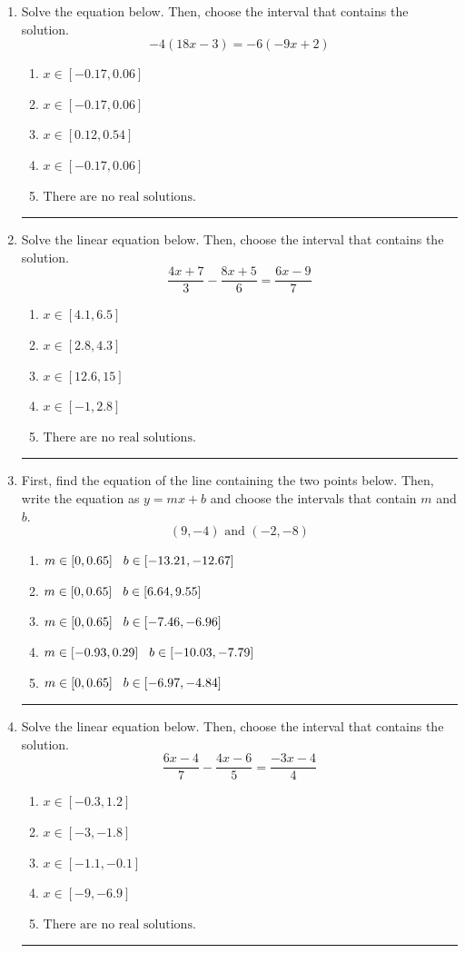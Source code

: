 \documentclass[14pt]{extbook}
\newcommand{\litem}[1]{\item#1\hspace*{-1cm}\rule{\textwidth}{0.4pt}}
\begin{document}
\begin{enumerate}
{\begin{enumerate}[label=\Alph*.]
\end{enumerate} }
\litem{
Solve the equation below. Then, choose the interval that contains the solution.\[ -4(18x -3) = -6(-9x + 2) \]\begin{enumerate}[label=\Alph*.]
\item \( x \in [-0.17, 0.06] \)
\item \( x \in [-0.17, 0.06] \)
\item \( x \in [0.12, 0.54] \)
\item \( x \in [-0.17, 0.06] \)
\item \( \text{There are no real solutions.} \)

\end{enumerate} }
\litem{
Solve the linear equation below. Then, choose the interval that contains the solution.\[ \frac{4x + 7}{3} - \frac{8x + 5}{6} = \frac{6x -9}{7} \]\begin{enumerate}[label=\Alph*.]
\item \( x \in [4.1, 6.5] \)
\item \( x \in [2.8, 4.3] \)
\item \( x \in [12.6, 15] \)
\item \( x \in [-1, 2.8] \)
\item \( \text{There are no real solutions.} \)

\end{enumerate} }
\litem{
First, find the equation of the line containing the two points below. Then, write the equation as $ y=mx+b $ and choose the intervals that contain $m$ and $b$.\[ (9, -4) \text{ and } (-2, -8) \]\begin{enumerate}[label=\Alph*.]
\item \( m \in [0, 0.65] \hspace*{3mm} b \in [-13.21, -12.67] \)
\item \( m \in [0, 0.65] \hspace*{3mm} b \in [6.64, 9.55] \)
\item \( m \in [0, 0.65] \hspace*{3mm} b \in [-7.46, -6.96] \)
\item \( m \in [-0.93, 0.29] \hspace*{3mm} b \in [-10.03, -7.79] \)
\item \( m \in [0, 0.65] \hspace*{3mm} b \in [-6.97, -4.84] \)

\end{enumerate} }
\litem{
Solve the linear equation below. Then, choose the interval that contains the solution.\[ \frac{6x -4}{7} - \frac{4x -6}{5} = \frac{-3x -4}{4} \]\begin{enumerate}[label=\Alph*.]
\item \( x \in [-0.3, 1.2] \)
\item \( x \in [-3, -1.8] \)
\item \( x \in [-1.1, -0.1] \)
\item \( x \in [-9, -6.9] \)
\item \( \text{There are no real solutions.} \)

\end{enumerate} }
\end{enumerate}
\end{document}
